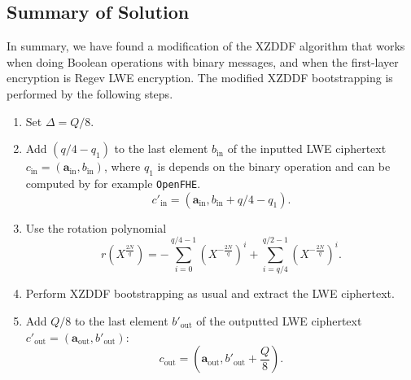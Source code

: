 \subsection{Summary of Solution}
In summary, we have found a modification of the XZDDF algorithm that works when doing Boolean operations with binary messages, and when the first-layer encryption is Regev LWE encryption. The modified XZDDF bootstrapping is performed by the following steps.
\begin{enumerate}
    \item Set $\Delta = Q/8$.
    \item Add $(q/4-q_1)$ to the last element $b_{\text{{in}}}$ of the inputted LWE ciphertext \linebreak $c_{\text{{in}}}=(\mathbf{a}_{\text{{in}}},b_{\text{{in}}})$, where $q_1$ is depends on the binary operation and can be computed by for example \texttt{OpenFHE}.
    $$c'_{\text{{in}}} = \left(\mathbf{a}_{\text{{in}}},b_{\text{{in}}} + q/4-q_1\right).$$
    \item Use the rotation polynomial $$r(X^{\frac{2N}{q}}) = -\sum_{i=0}^{q/4-1} \left(X^{-\frac{2N}{q}}\right)^i + \sum_{i=q/4}^{q/2-1} \left(X^{-\frac{2N}{q}}\right)^i.$$
    \item Perform XZDDF bootstrapping as usual and extract the LWE ciphertext.
    \item Add $Q/8$ to the last element $b'_{\text{out}}$ of the outputted LWE ciphertext \linebreak $c'_{\text{out}}=(\mathbf{a}_{\text{out}},b'_{\text{out}})$:
    $$c_{\text{out}} = \left(\mathbf{a}_{\text{out}},b'_{\text{out}} + \frac{Q}{8}\right).$$
\end{enumerate}